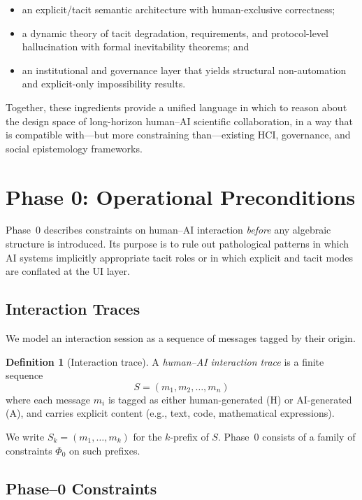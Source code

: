 \documentclass[11pt]{article}
\theoremstyle{definition}
\newtheorem{definition}[theorem]{Definition}
\begin{document}
\begin{itemize}
  \item an explicit/tacit semantic architecture with human-exclusive correctness;
  \item a dynamic theory of tacit degradation, requirements, and protocol-level hallucination with formal inevitability theorems; and
  \item an institutional and governance layer that yields structural non-automation and explicit-only impossibility results.
\end{itemize}

Together, these ingredients provide a unified language in which to reason about the design space of long-horizon human--AI scientific collaboration, in a way that is compatible with---but more constraining than---existing HCI, governance, and social epistemology frameworks.

\section{Phase 0: Operational Preconditions}
\label{sec:phase0}

Phase~0 describes constraints on human--AI interaction \emph{before}
any algebraic structure is introduced. Its purpose is to rule out
pathological patterns in which AI systems implicitly appropriate tacit
roles or in which explicit and tacit modes are conflated at the UI
layer.

\subsection{Interaction Traces}

We model an interaction session as a sequence of messages tagged by
their origin.

\begin{definition}[Interaction trace]
A \emph{human--AI interaction trace} is a finite sequence
\[
S = (m_1, m_2, \dots, m_n)
\]
where each message \(m_i\) is tagged as either human-generated (H) or
AI-generated (A), and carries explicit content (e.g., text, code,
mathematical expressions).
\end{definition}

We write \(S_k = (m_1,\dots,m_k)\) for the \(k\)-prefix of \(S\). Phase~0
consists of a family of constraints \(\Phi_0\) on such prefixes.

\subsection{Phase--0 Constraints}
\end{document}
